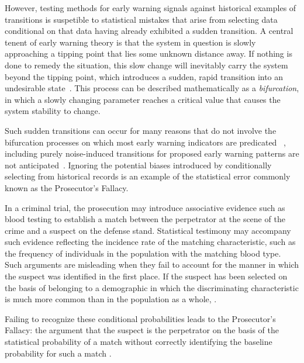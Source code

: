 \documentclass[authoryear,review,12pt]{elsarticle}
\begin{document}
However, testing methods for early warning signals against historical examples of
transitions is suspetible to statistical mistakes that arise from selecting
data conditional on that data having already exhibited a sudden transition.  
A central tenent of early warning theory is that the system in question is slowly
approaching a tipping point that lies some unknown distance away.  If nothing
is done to remedy the situation, this slow change will inevitably carry the 
system beyond the tipping point, which introduces a sudden, rapid transition into an 
undesirable state~\citep{Scheffer2009}. This process can be described mathematically
as a \emph{bifurcation}, in which a slowly changing parameter reaches a critical
value that causes the system stability to change.  


Such
sudden transitions can occur for many reasons that do not involve the 
bifurcation processes on which most early warning indicators are predicated
~\citep{Hastings2010}, including purely noise-induced transitions for proposed 
early warning patterns are not anticipated~\citep{Ditlevsen2010, Lenton2011}. 
Ignoring the potential biases introduced by conditionally selecting from 
historical records is an example of the statistical error commonly known as the
Prosecutor's Fallacy.


In a criminal trial, the prosecution may introduce associative evidence such as 
blood testing to establish a match between the perpetrator at the scene of the
crime and a suspect on the defense stand.  Statistical testimony may accompany 
such evidence reflecting the incidence rate of the matching characteristic,
such as the frequency of individuals in the population with the matching
blood type.  Such arguments are misleading when they fail to account for  
the manner in which the suspect was identified in the first place.  If the suspect has been selected on the basis of 
belonging to a demographic in which the discriminating characteristic is much more common than
in the population as a whole, .  

Failing to recognize 
these conditional probabilities leads to the Prosecutor's Fallacy: the 
argument that the suspect is the perpetrator on the basis of the statistical 
probability of a match without correctly identifying the baseline probability 
for such a match \citep{Thompson1987}.

\end{document}
